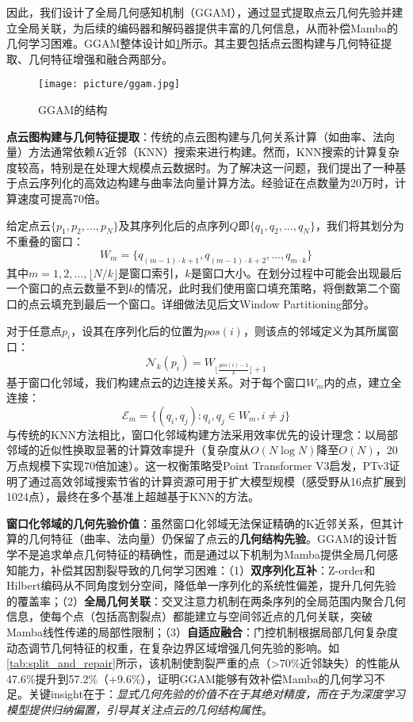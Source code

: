 \documentclass[preprint,12pt]{elsarticle}
\begin{document}
因此，我们设计了全局几何感知机制（GGAM），通过显式提取点云几何先验并建立全局关联，为后续的编码器和解码器提供丰富的几何信息，从而补偿Mamba的几何学习困难。GGAM整体设计如\cref{fig:ggam}所示。其主要包括点云图构建与几何特征提取、几何特征增强和融合两部分。
\begin{figure}[htbp]
	\centering
	\texttt{[image: picture/ggam.jpg]}
	\caption{GGAM的结构}
	\label{fig:ggam}
\end{figure}

\textbf{点云图构建与几何特征提取}：传统的点云图构建与几何关系计算（如曲率、法向量）方法通常依赖$K$近邻（KNN）搜索来进行构建。然而，KNN搜索的计算复杂度较高，特别是在处理大规模点云数据时。为了解决这一问题，我们提出了一种基于点云序列化的高效边构建与曲率法向量计算方法。经验证在点数量为20万时，计算速度可提高70倍。


给定点云$\{p_1, p_2, \ldots, p_N\}$及其序列化后的点序列$Q$即$\{q_1, q_2, \ldots, q_N\}$，我们将其划分为不重叠的窗口：
\begin{equation}
	W_m = \{q_{(m-1) \cdot k + 1}, q_{(m-1) \cdot k + 2}, \ldots, q_{m \cdot k}\}
\end{equation}
其中$m = 1, 2, \ldots, \lfloor N/k \rfloor$是窗口索引，$k$是窗口大小。在划分过程中可能会出现最后一个窗口的点云数量不到$k$的情况，此时我们使用窗口填充策略，将倒数第二个窗口的点云填充到最后一个窗口。详细做法见后文Window Partitioning部分。

对于任意点$p_i$，设其在序列化后的位置为$pos(i)$，则该点的邻域定义为其所属窗口：
\begin{equation}
	\mathcal{N}_k(p_i) = W_{\lfloor \frac{pos(i)-1}{k} \rfloor + 1}
\end{equation}
基于窗口化邻域，我们构建点云的边连接关系。对于每个窗口$W_m$内的点，建立全连接：
\begin{equation}
	\mathcal{E}_m = \{(q_i, q_j) : q_i, q_j \in W_m, i \neq j\}
\end{equation}
与传统的KNN方法相比，窗口化邻域构建方法采用效率优先的设计理念：以局部邻域的近似性换取显著的计算效率提升（复杂度从$O(N\log N)$降至$O(N)$，20万点规模下实现70倍加速）。这一权衡策略受Point Transformer V3\cite{ptv3}启发，PTv3证明了通过高效邻域搜索节省的计算资源可用于扩大模型规模（感受野从16点扩展到1024点），最终在多个基准上超越基于KNN的方法。

\textbf{窗口化邻域的几何先验价值}：虽然窗口化邻域无法保证精确的K近邻关系，但其计算的几何特征（曲率、法向量）仍保留了点云的\textbf{几何结构先验}。GGAM的设计哲学不是追求单点几何特征的精确性，而是通过以下机制为Mamba提供全局几何感知能力，补偿其因割裂导致的几何学习困难：（1）\textbf{双序列化互补}：Z-order和Hilbert编码从不同角度划分空间，降低单一序列化的系统性偏差，提升几何先验的覆盖率；（2）\textbf{全局几何关联}：交叉注意力机制在两条序列的全局范围内聚合几何信息，使每个点（包括高割裂点）都能建立与空间邻近点的几何关联，突破Mamba线性传递的局部性限制；（3）\textbf{自适应融合}：门控机制根据局部几何复杂度动态调节几何特征的权重，在复杂边界区域增强几何先验的影响。如\cref{tab:split_and_repair}所示，该机制使割裂严重的点（>70\%近邻缺失）的性能从47.6\%提升到57.2\%（+9.6\%），证明GGAM能够有效补偿Mamba的几何学习不足。关键insight在于：\textit{显式几何先验的价值不在于其绝对精度，而在于为深度学习模型提供归纳偏置，引导其关注点云的几何结构属性}。
\end{document}
